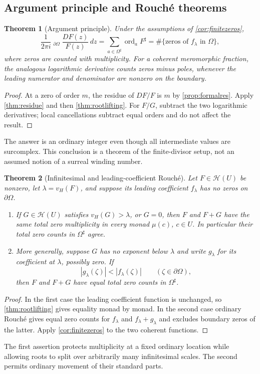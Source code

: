 \documentclass[11pt,letterpaper]{article}
\newtheorem{theorem}{Theorem}[section]
\theoremstyle{definition}
\theoremstyle{remark}
\newcommand{\HH}{\mathcal H}
\newcommand{\ord}{\operatorname{ord}}
\newcommand{\HCoint}{\mathop{\oint^{\!H}}\nolimits}
\newcommand{\sh}{^{\sharp}}
\numberwithin{equation}{section}
\begin{document}
\subsection{Argument principle and Rouch\'e theorems}
\begin{theorem}[Argument principle]\label{thm:argument}
Under the assumptions of \cref{cor:finitezeros},
\begin{equation}\label{eq:argument}
 \frac1{2\pi i}\HCoint_{\partial\Omega}\frac{DF(z)}{F(z)}\,dz
 =\sum_{a\in\Omega\sh}\ord_aF\sh
 =\#\{\text{zeros of }f_\lambda\text{ in }\Omega\},
\end{equation}
where zeros are counted with multiplicity. For a coherent meromorphic fraction, the analogous logarithmic derivative counts zeros minus poles, whenever the leading numerator and denominator are nonzero on the boundary.
\end{theorem}
\begin{proof}
At a zero of order $m$, the residue of $DF/F$ is $m$ by \cref{prop:formalres}. Apply \cref{thm:residue} and then \cref{thm:rootlifting}. For $F/G$, subtract the two logarithmic derivatives; local cancellations subtract equal orders and do not affect the result.
\end{proof}
The answer is an ordinary integer even though all intermediate values are surcomplex. This conclusion is a theorem of the finite-divisor setup, not an assumed notion of a surreal winding number.

\begin{theorem}[Infinitesimal and leading-coefficient Rouch\'e]\label{thm:Rouche}
Let $F\in\HH(U)$ be nonzero, let $\lambda=v_H(F)$, and suppose its leading coefficient $f_\lambda$ has no zeros on $\partial\Omega$.
\begin{enumerate}
\item If $G\in\HH(U)$ satisfies $v_H(G)>\lambda$, or $G=0$, then $F$ and $F+G$ have the same total zero multiplicity in \emph{every} monad $\mu(c)$, $c\in U$. In particular their total zero counts in $\Omega\sh$ agree.
\item More generally, suppose $G$ has no exponent below $\lambda$ and write $g_\lambda$ for its coefficient at $\lambda$, possibly zero. If
\[
 |g_\lambda(\zeta)|<|f_\lambda(\zeta)|\qquad(\zeta\in\partial\Omega),
\]
then $F$ and $F+G$ have equal total zero counts in $\Omega\sh$.
\end{enumerate}
\end{theorem}
\begin{proof}
In the first case the leading coefficient function is unchanged, so \cref{thm:rootlifting} gives equality monad by monad. In the second case ordinary Rouch\'e gives equal zero counts for $f_\lambda$ and $f_\lambda+g_\lambda$ and excludes boundary zeros of the latter. Apply \cref{cor:finitezeros} to the two coherent functions.
\end{proof}
The first assertion protects multiplicity at a fixed ordinary location while allowing roots to split over arbitrarily many infinitesimal scales. The second permits ordinary movement of their standard parts.
\end{document}
